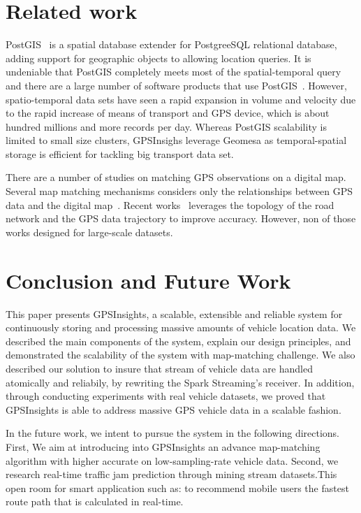 \documentclass{acm_proc_article-sp}
\begin{document}
\section{Related work}

PostGIS~\cite{posgis} is a spatial database extender for PostgreeSQL relational database, adding support for geographic objects to allowing location queries. It is undeniable that PostGIS completely meets most of the spatial-temporal query and there are a large number of software products that use PostGIS~\cite{backendposgis}. However, spatio-temporal data sets have seen a rapid expansion in volume and velocity due to the rapid increase of means of transport and GPS device, which is about hundred millions and more records per day. Whereas PostGIS scalability is limited to small size clusters, GPSInsighs leverage Geomesa as temporal-spatial storage is efficient for tackling big transport data set.

There are a number of studies on matching GPS observations on a digital map. Several map matching mechanisms considers only the relationships between GPS data and the digital map~\cite{noh1998map}. Recent works~\cite{yang2005map} leverages the topology of the road network and the GPS data trajectory to improve accuracy. However, non of those works designed for large-scale datasets.  

\section{Conclusion and Future Work}

This paper presents GPSInsights, a scalable, extensible and reliable system for continuously storing and processing massive amounts of vehicle location data. We described the main components of the system, explain our design principles, and demonstrated the scalability of the system with map-matching challenge. We also described our solution to insure that stream of vehicle data are handled atomically and reliabily, by rewriting the Spark Streaming's receiver. In addition, through conducting experiments with real vehicle datasets, we proved that GPSInsights is able to address massive GPS vehicle data in a scalable fashion.

In the future work, we intent to pursue the system in the following directions. First, We aim at introducing into GPSInsights an advance map-matching algorithm with higher accurate on low-sampling-rate vehicle data. Second, we research real-time traffic jam prediction through mining stream datasets.This open room for smart application such as: to recommend mobile users the fastest route path that is calculated in real-time.
%

%
%
\appendix \label{appendix}
\end{document}
